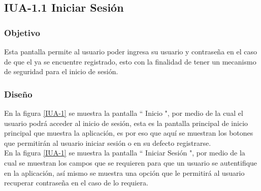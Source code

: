 \subsection{IUA-1.1 Iniciar Sesión}

\subsubsection{Objetivo}

	
    Esta pantalla permite al usuario poder ingresa su usuario y contraseña en el caso de que el ya se encuentre registrado, esto con la finalidad de tener un mecanismo de seguridad para el inicio de sesión.

\subsubsection{Diseño}


    En la figura \ref{IUA-1} se muestra la pantalla `` Inicio ", por medio de la cual el usuario podrá acceder al inicio de sesión, esta es la pantalla principal de inicio principal que muestra la aplicación, es por eso que aquí se muestran los botones que permitirán al usuario iniciar sesión o en su defecto registrarse.\\
    
    En la figura \ref{IUA-1} se muestra la pantalla `` Iniciar Sesión ", por medio de la cual se muestran los campos que se requieren para que un usuario se autentifique en la aplicación, así mismo se muestra una opción que le permitirá al usuario recuperar contraseña en el caso de lo requiera.


